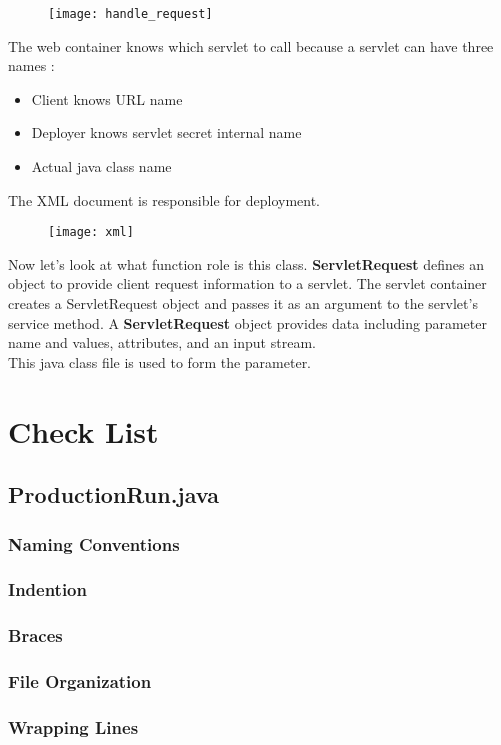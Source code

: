 \documentclass{article}
\begin{document}
\begin{figure}[h]
\centering
\texttt{[image: handle\_request]}
\end{figure}
\newpage
The web container knows which servlet to call because a servlet can have three names :
\begin{itemize}
	\item Client knows URL name
	\item Deployer knows servlet secret internal name
	\item Actual java class name
\end{itemize}
 The XML document is responsible for deployment.
 \begin{figure}[h]
 	\centering
 	\texttt{[image: xml]}
 \end{figure}
\newpage
Now let's look at what function role is this class. \textbf{ServletRequest} defines an object to provide client request information to a servlet. The servlet container creates a ServletRequest object and passes it as an argument to the servlet's service method. A \textbf{ServletRequest} object provides data including parameter name and values, attributes, and an input stream.\\
This java class file is used to form the parameter.
\section{Check List}
 \subsection{ProductionRun.java}
  \subsubsection{Naming Conventions}
  \subsubsection{Indention}
  \subsubsection{Braces}
  \subsubsection{File Organization}
  \subsubsection{Wrapping Lines}
\end{document}
